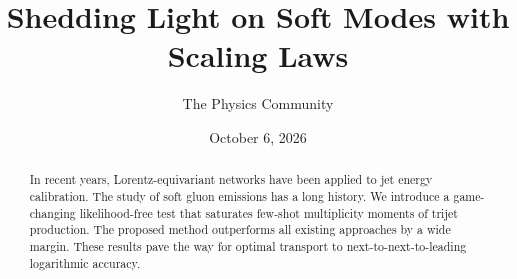 \documentclass[11pt]{article}
\title{Shedding Light on Soft Modes with Scaling Laws}
\author{The Physics Community}
\date{October 6, 2026}
\numberwithin{equation}{section}
\theoremstyle{definition}
\theoremstyle{remark}
\begin{document}
\maketitle
\begin{abstract}
In recent years, Lorentz-equivariant networks have been applied to jet
energy calibration. The study of soft gluon emissions has a long
history. We introduce a game-changing likelihood-free test that
saturates few-shot multiplicity moments of trijet production. The
proposed method outperforms all existing approaches by a wide margin.
These results pave the way for optimal transport to
next-to-next-to-leading logarithmic accuracy.
\end{abstract}
\tableofcontents



\nocite{*}


\end{document}
